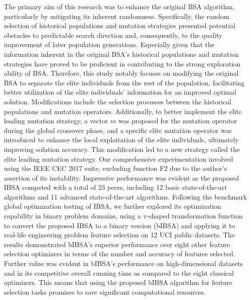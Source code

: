 \documentclass{article} %
\begin{document}
The primary aim of this research was to enhance the original BSA algorithm, particularly by mitigating its inherent randomness. Specifically, the random selection of historical populations and mutation strategies presented potential obstacles to predictable search direction and, consequently, to the quality improvement of later population generations. Especially given that the information inherent in the original BSA's historical populations and mutation strategies have proved to be proficient in contributing to the strong exploration ability of BSA. Therefore, this study notably focuses on modifying the original BSA to separate the elite individuals from the rest of the population, facilitating better utilization of the elite individuals' information for an improved optimal solution. Modifications include the selection processes between the historical populations and mutation operators. Additionally, to better implement the elite leading mutation strategy, a vector $m$ was proposed for the mutation operator during the global crossover phase, and a specific elite mutation operator was introduced to enhance the local exploitation of the elite individuals, ultimately improving solution accuracy. This modification led to a new strategy called the elite leading mutation strategy. Our comprehensive experimentation involved using the IEEE CEC 2017 suite, excluding function F2 due to the author's assertion of its instability. Impressive performance was evident as the proposed IBSA competed with a total of 23 peers, including 12 basic state-of-the-art algorithms and 11 advanced state-of-the-art algorithms. Following the benchmark global optimization testing of IBSA, we further explored its optimization capability in binary problem domains, using a v-shaped transformation function to convert the proposed IBSA to a binary version (bIBSA) and applying it to real-life engineering problem feature selection on 12 UCI public datasets. The results demonstrated bIBSA's superior performance over eight other feature selection optimizers in terms of the number and accuracy of features selected. Further value was evident in bIBSA's performance on high-dimensional datasets and in its competitive overall running time as compared to the eight classical optimizers. This means that using the proposed bIBSA algorithm for feature selection tasks promises to save significant computational resources.
\end{document}
